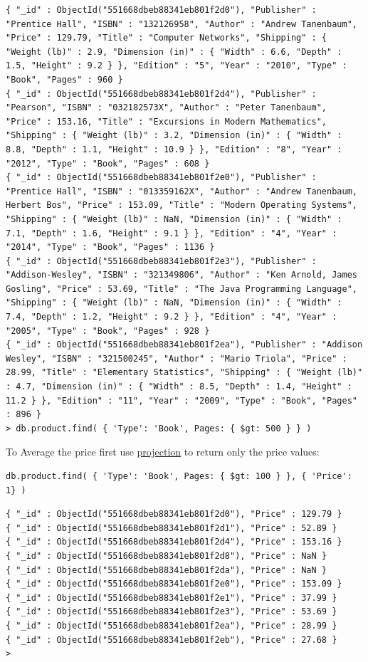 \documentclass[11pt]{article}
\begin{document}
\begin{verbatim}
{ "_id" : ObjectId("551668dbeb88341eb801f2d0"), "Publisher" : "Prentice Hall", "ISBN" : "132126958", "Author" : "Andrew Tanenbaum", "Price" : 129.79, "Title" : "Computer Networks", "Shipping" : { "Weight (lb)" : 2.9, "Dimension (in)" : { "Width" : 6.6, "Depth" : 1.5, "Height" : 9.2 } }, "Edition" : "5", "Year" : "2010", "Type" : "Book", "Pages" : 960 }
{ "_id" : ObjectId("551668dbeb88341eb801f2d4"), "Publisher" : "Pearson", "ISBN" : "032182573X", "Author" : "Peter Tanenbaum", "Price" : 153.16, "Title" : "Excursions in Modern Mathematics", "Shipping" : { "Weight (lb)" : 3.2, "Dimension (in)" : { "Width" : 8.8, "Depth" : 1.1, "Height" : 10.9 } }, "Edition" : "8", "Year" : "2012", "Type" : "Book", "Pages" : 608 }
{ "_id" : ObjectId("551668dbeb88341eb801f2e0"), "Publisher" : "Prentice Hall", "ISBN" : "013359162X", "Author" : "Andrew Tanenbaum, Herbert Bos", "Price" : 153.09, "Title" : "Modern Operating Systems", "Shipping" : { "Weight (lb)" : NaN, "Dimension (in)" : { "Width" : 7.1, "Depth" : 1.6, "Height" : 9.1 } }, "Edition" : "4", "Year" : "2014", "Type" : "Book", "Pages" : 1136 }
{ "_id" : ObjectId("551668dbeb88341eb801f2e3"), "Publisher" : "Addison-Wesley", "ISBN" : "321349806", "Author" : "Ken Arnold, James Gosling", "Price" : 53.69, "Title" : "The Java Programming Language", "Shipping" : { "Weight (lb)" : NaN, "Dimension (in)" : { "Width" : 7.4, "Depth" : 1.2, "Height" : 9.2 } }, "Edition" : "4", "Year" : "2005", "Type" : "Book", "Pages" : 928 }
{ "_id" : ObjectId("551668dbeb88341eb801f2ea"), "Publisher" : "Addison Wesley", "ISBN" : "321500245", "Author" : "Mario Triola", "Price" : 28.99, "Title" : "Elementary Statistics", "Shipping" : { "Weight (lb)" : 4.7, "Dimension (in)" : { "Width" : 8.5, "Depth" : 1.4, "Height" : 11.2 } }, "Edition" : "11", "Year" : "2009", "Type" : "Book", "Pages" : 896 }
> db.product.find( { 'Type': 'Book', Pages: { $gt: 500 } } )
\end{verbatim}

To Average the price first use \href{https://docs.mongodb.com/manual/tutorial/project-fields-from-query-results/}{projection} to return only the price values:

\begin{verbatim}
db.product.find( { 'Type': 'Book', Pages: { $gt: 100 } }, { 'Price': 1} )
\end{verbatim}

\begin{verbatim}
{ "_id" : ObjectId("551668dbeb88341eb801f2d0"), "Price" : 129.79 }
{ "_id" : ObjectId("551668dbeb88341eb801f2d1"), "Price" : 52.89 }
{ "_id" : ObjectId("551668dbeb88341eb801f2d4"), "Price" : 153.16 }
{ "_id" : ObjectId("551668dbeb88341eb801f2d8"), "Price" : NaN }
{ "_id" : ObjectId("551668dbeb88341eb801f2da"), "Price" : NaN }
{ "_id" : ObjectId("551668dbeb88341eb801f2e0"), "Price" : 153.09 }
{ "_id" : ObjectId("551668dbeb88341eb801f2e1"), "Price" : 37.99 }
{ "_id" : ObjectId("551668dbeb88341eb801f2e3"), "Price" : 53.69 }
{ "_id" : ObjectId("551668dbeb88341eb801f2ea"), "Price" : 28.99 }
{ "_id" : ObjectId("551668dbeb88341eb801f2eb"), "Price" : 27.68 }
>
\end{verbatim}
\end{document}
